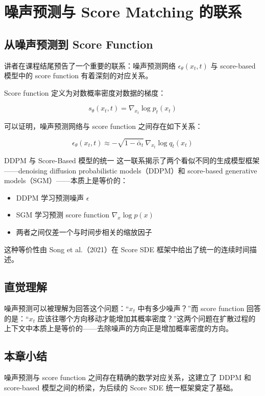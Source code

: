 \section{噪声预测与 Score Matching 的联系}

\subsection{从噪声预测到 Score Function}

讲者在课程结尾预告了一个重要的联系：噪声预测网络 $\epsilon_\theta(x_t, t)$ 与 score-based 模型中的 score function 有着深刻的对应关系。

Score function 定义为对数概率密度对数据的梯度：

$$s_\theta(x_t, t) = \nabla_{x_t} \log p_t(x_t)$$

可以证明，噪声预测网络与 score function 之间存在如下关系：

$$\epsilon_\theta(x_t, t) \approx -\sqrt{1 - \bar{\alpha}_t}\, \nabla_{x_t} \log q_t(x_t)$$

\begin{knowledgebox}{DDPM 与 Score-Based 模型的统一}
这一联系揭示了两个看似不同的生成模型框架——denoising diffusion probabilistic models（DDPM）和 score-based generative models（SGM）——本质上是等价的：
\begin{itemize}
    \item DDPM 学习预测噪声 $\epsilon$
    \item SGM 学习预测 score function $\nabla_x \log p(x)$
    \item 两者之间仅差一个与时间步相关的缩放因子
\end{itemize}
这种等价性由 Song et al.（2021）在 Score SDE 框架中给出了统一的连续时间描述。
\end{knowledgebox}

\subsection{直觉理解}

噪声预测可以被理解为回答这个问题：``$x_t$ 中有多少噪声？''而 score function 回答的是：``$x_t$ 应该往哪个方向移动才能增加其概率密度？''这两个问题在扩散过程的上下文中本质上是等价的——去除噪声的方向正是增加概率密度的方向。

\subsection{本章小结}

噪声预测与 score function 之间存在精确的数学对应关系，这建立了 DDPM 和 score-based 模型之间的桥梁，为后续的 Score SDE 统一框架奠定了基础。


